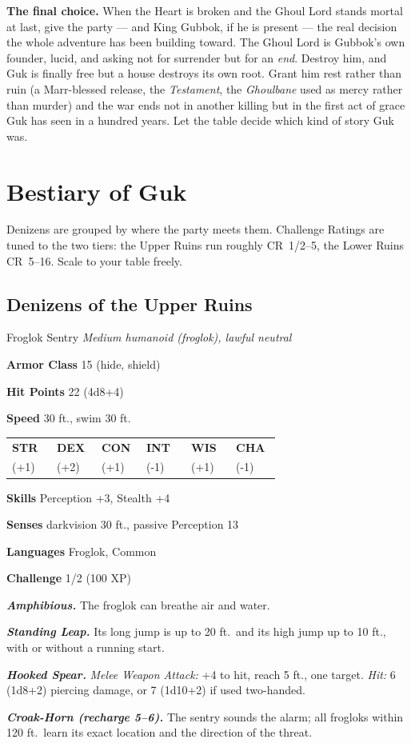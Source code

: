 \documentclass[10pt,twoside]{report}
\makeatletter
\newcommand{\msub}[1]{{\itshape #1}\par}
\newcommand{\mrule}{\par\vspace{2pt}{\color{gukred}\rule{\linewidth}{1.1pt}}\par\vspace{2pt}}
\newcommand{\mthin}{\par\vspace{1pt}{\color{gukred!60}\rule{\linewidth}{0.5pt}}\par\vspace{2pt}}
\newcommand{\mfield}[2]{\noindent\textbf{\color{gukred}#1} #2\par}
\newcommand{\mhead}[1]{\par\smallskip{\sffamily\bfseries\scshape\color{gukred}#1}\par
  \vspace{-3pt}{\color{gukred}\rule{\linewidth}{0.7pt}}\par\vspace{2pt}}
\newcommand{\mtrait}[2]{\noindent\textbf{\itshape #1} #2\par\vspace{2pt}}
\newcommand{\abilities}[6]{\par\smallskip\noindent
  {\setlength{\tabcolsep}{1.5pt}%
  \begin{tabular}{@{}*{6}{p{0.15\linewidth}}@{}}
  \centering\sffamily\bfseries\color{gukred}STR &\centering\sffamily\bfseries\color{gukred}DEX
  &\centering\sffamily\bfseries\color{gukred}CON &\centering\sffamily\bfseries\color{gukred}INT
  &\centering\sffamily\bfseries\color{gukred}WIS &\centering\arraybackslash\sffamily\bfseries\color{gukred}CHA\\
  \centering #1 &\centering #2 &\centering #3 &\centering #4 &\centering #5 &\centering\arraybackslash #6\\
  \end{tabular}}\par\smallskip}
\makeatother
\begin{document}
\begin{gmnote}
\textbf{The final choice.} When the Heart is broken and the Ghoul Lord stands mortal at last, give the party --- and King Gubbok, if he is present --- the real decision the whole adventure has been building toward. The Ghoul Lord is Gubbok's own founder, lucid, and asking not for surrender but for an \emph{end}. Destroy him, and Guk is finally free but a house destroys its own root. Grant him rest rather than ruin (a Marr-blessed release, the \emph{Testament}, the \emph{Ghoulbane} used as mercy rather than murder) and the war ends not in another killing but in the first act of grace Guk has seen in a hundred years. Let the table decide which kind of story Guk was.
\end{gmnote}

\clearpage

\chapter{Bestiary of Guk}
\noindent Denizens are grouped by where the party meets them. Challenge Ratings are tuned to the two tiers: the Upper Ruins run roughly CR~1/2--5, the Lower Ruins CR~5--16. Scale to your table freely.

\section{Denizens of the Upper Ruins}

\begin{statblock}{Froglok Sentry}
\msub{Medium humanoid (froglok), lawful neutral}
\mrule
\mfield{Armor Class}{15 (hide, shield)}
\mfield{Hit Points}{22 (4d8+4)}
\mfield{Speed}{30 ft., swim 30 ft.}
\abilities{13 (+1)}{14 (+2)}{13 (+1)}{9 (-1)}{12 (+1)}{9 (-1)}
\mthin
\mfield{Skills}{Perception +3, Stealth +4}
\mfield{Senses}{darkvision 30 ft., passive Perception 13}
\mfield{Languages}{Froglok, Common}
\mfield{Challenge}{1/2 (100 XP)}
\mrule
\mtrait{Amphibious.}{The froglok can breathe air and water.}
\mtrait{Standing Leap.}{Its long jump is up to 20 ft.\ and its high jump up to 10 ft., with or without a running start.}
\mhead{Actions}
\mtrait{Hooked Spear.}{\textit{Melee Weapon Attack:} +4 to hit, reach 5 ft., one target. \textit{Hit:} 6 (1d8+2) piercing damage, or 7 (1d10+2) if used two-handed.}
\mtrait{Croak-Horn (recharge 5--6).}{The sentry sounds the alarm; all frogloks within 120 ft.\ learn its exact location and the direction of the threat.}
\end{statblock}
\end{document}
